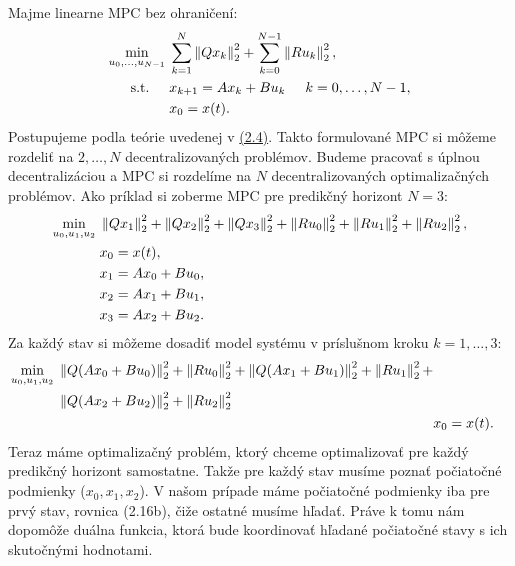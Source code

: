 Majme linearne MPC bez ohraničení:
\label{math:2.14}
\begin{subequations}
	\begin{align}
		\displaystyle \min_{u_0,...,u_{N-1}} \hspace{0.1cm} & 
		\sum_{k=1}^{N}\left\lVert Qx_k\right\rVert^{2}_{2}+\sum_{k=0}^{N-1}\left\lVert Ru_k\right\rVert^{2}_{2},\\
		\textrm{s.t.} \hspace{0.5cm} & x_{k+1} = Ax_{k}+Bu_{k}\hspace{0.5cm} k=0,\dots,N-1,\\
		& x_{0} = x(t).
	\end{align}
\end{subequations}
Postupujeme podla teórie uvedenej v \hyperref[subse:ADMM]{(2.4)}. Takto formulované MPC si môžeme rozdeliť na $2,\dots,N$ decentralizovaných problémov. Budeme pracovať s úplnou decentralizáciou a MPC si rozdelíme na $N$ decentralizovaných optimalizačných problémov.
\label{math:ADMM_MPC}
Ako príklad si zoberme MPC pre predikčný horizont $N = 3$:
\begin{subequations}
	\begin{align}
		\displaystyle\min_{u_0,u_1,u_2}\hspace{0.1cm}&\left\lVert Qx_1\right\rVert^{2}_{2}+\left\lVert Qx_2\right\rVert^{2}_{2}+\left\lVert Qx_3\right\rVert^{2}_{2}+\left\lVert Ru_0\right\rVert^{2}_{2}+\left\lVert Ru_1\right\rVert^{2}_{2}+\left\lVert Ru_2\right\rVert^{2}_{2},\\
		& x_{0} = x(t),\\
		&x_{1} = Ax_{0}+Bu_{0},\\
		&x_{2} = Ax_{1}+Bu_{1},\\
		&x_{3} = Ax_{2}+Bu_{2}.
	\end{align}
\end{subequations}
Za každý stav si môžeme dosadiť model systému v príslušnom kroku $k=1,\dots,3$:
\begin{subequations}
	\begin{align}	
	\begin{split}			
			\displaystyle\min_{u_0,u_1,u_2}\hspace{0.1cm}&\left\lVert Q(Ax_{0}+Bu_{0})\right\rVert^{2}_{2}+\left\lVert Ru_0\right\rVert^{2}_{2}+\left\lVert Q(Ax_{1}+Bu_{1})\right\rVert^{2}_{2}+\left\lVert Ru_1\right\rVert^{2}_{2}+\\
			&\left\lVert Q(Ax_{2}+Bu_{2})\right\rVert^{2}_{2}+\left\lVert Ru_2\right\rVert^{2}_{2}
	\end{split}\\
	& x_{0} = x(t).
	\end{align}
\end{subequations}
Teraz máme optimalizačný problém, ktorý chceme optimalizovať pre každý predikčný horizont samostatne. Takže pre každý stav musíme poznať počiatočné podmienky ($x_0,x_1,x_2$). V našom prípade máme počiatočné podmienky iba pre prvý stav, rovnica (2.16b), čiže ostatné musíme hľadať. Práve k tomu nám dopomôže duálna funkcia, ktorá bude koordinovať hľadané počiatočné stavy s ich skutočnými hodnotami. 

